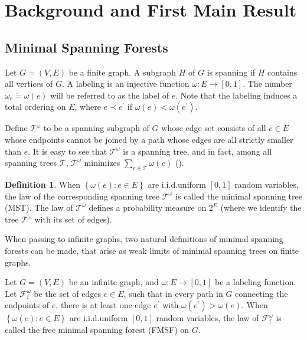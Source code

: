 \documentclass[12pt, twoside,a4paper,reqno]{amsart}
\theoremstyle{plain}
\theoremstyle{remark}
\theoremstyle{definition}
\newtheorem{definition}{Definition}[section]
\begin{document}
\section{Background and First Main Result\label{sec:back}}

\subsection{Minimal Spanning Forests\label{sec:MSF}}
Let $G=\left( V,E\right) $ be a finite graph. A subgraph $H$ of $G$ is spanning
if $H$ contains all vertices of $G$. A labeling is an injective
function $\omega :E\rightarrow %
\left[ 0,1\right] $. The number $\omega _{e}\dot{=%
}\omega \left( e\right) $ will be referred to as the label of $e$. Note that the
labeling induces a total ordering on $E$, where $e\prec e^{\prime }$ if $%
\omega \left( e\right) <\omega \left( e^{\prime }\right) $.

Define $\mathcal{T}^{\omega }$ to be a spanning subgraph of $G$ whose edge
set consists of all $e\in E$ whose endpoints cannot be joined by a path
whose edges are all strictly smaller than $e$. It is easy to see that $\mathcal{T}%
^{\omega }$ is a spanning tree, and in fact, among all spanning trees $%
\mathcal{T}$, $\mathcal{T}^{\omega }$ minimizes $\sum_{e\in \mathcal{T}%
}\omega \left( e\right) $ (\cite{LPS}).

\begin{definition}
  When $\left\{ \omega \left( e\right) :e\in E\right\} $ are i.i.d.\@ uniform $%
  \left[ 0,1\right] $ random variables, the law of the corresponding spanning
  tree $\mathcal{T}^{\omega }$ is called the minimal spanning tree (MST). The
  law of $\mathcal{T}^{\omega }$ defines a probability measure on $2^{E}$ (where we
  identify the tree $\mathcal{T}^{\omega }$ with its set of edges).
\end{definition}

When passing to infinite graphs, two natural definitions of minimal spanning
forests can be made, that arise as weak limits of minimal spanning trees on
finite graphs.

Let $G=\left( V,E\right) $ be an infinite graph, and $\omega :E\rightarrow %
\left[ 0,1\right] $ be a labeling function. Let $\mathcal{F}_{\mathrm f}^{\omega }$
be the set of edges $e\in E$, such that in every path in $G$ connecting the
endpoints of $e$, there is at least one edge $e^{\prime }$ with $\omega
\left( e^{\prime }\right) >\omega \left( e\right) $. When $\left\{ \omega
\left( e\right) :e\in E\right\} $ are i.i.d.\@ uniform $\left[ 0,1\right] $
random variables, the law of $\mathcal{F}_{\mathrm f}^{\omega }$ is called the free
minimal spanning forest (FMSF) on $G$.
\end{document}
